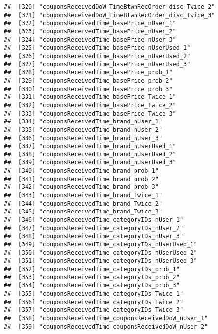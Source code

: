 \documentclass[10pt]{report}
\begin{document}
\begin{verbatim}
##  [320] "couponsReceivedDoW_TimeBtwnRecOrder_disc_Twice_2"     
##  [321] "couponsReceivedDoW_TimeBtwnRecOrder_disc_Twice_3"     
##  [322] "couponsReceivedTime_basePrice_nUser_1"                
##  [323] "couponsReceivedTime_basePrice_nUser_2"                
##  [324] "couponsReceivedTime_basePrice_nUser_3"                
##  [325] "couponsReceivedTime_basePrice_nUserUsed_1"            
##  [326] "couponsReceivedTime_basePrice_nUserUsed_2"            
##  [327] "couponsReceivedTime_basePrice_nUserUsed_3"            
##  [328] "couponsReceivedTime_basePrice_prob_1"                 
##  [329] "couponsReceivedTime_basePrice_prob_2"                 
##  [330] "couponsReceivedTime_basePrice_prob_3"                 
##  [331] "couponsReceivedTime_basePrice_Twice_1"                
##  [332] "couponsReceivedTime_basePrice_Twice_2"                
##  [333] "couponsReceivedTime_basePrice_Twice_3"                
##  [334] "couponsReceivedTime_brand_nUser_1"                    
##  [335] "couponsReceivedTime_brand_nUser_2"                    
##  [336] "couponsReceivedTime_brand_nUser_3"                    
##  [337] "couponsReceivedTime_brand_nUserUsed_1"                
##  [338] "couponsReceivedTime_brand_nUserUsed_2"                
##  [339] "couponsReceivedTime_brand_nUserUsed_3"                
##  [340] "couponsReceivedTime_brand_prob_1"                     
##  [341] "couponsReceivedTime_brand_prob_2"                     
##  [342] "couponsReceivedTime_brand_prob_3"                     
##  [343] "couponsReceivedTime_brand_Twice_1"                    
##  [344] "couponsReceivedTime_brand_Twice_2"                    
##  [345] "couponsReceivedTime_brand_Twice_3"                    
##  [346] "couponsReceivedTime_categoryIDs_nUser_1"              
##  [347] "couponsReceivedTime_categoryIDs_nUser_2"              
##  [348] "couponsReceivedTime_categoryIDs_nUser_3"              
##  [349] "couponsReceivedTime_categoryIDs_nUserUsed_1"          
##  [350] "couponsReceivedTime_categoryIDs_nUserUsed_2"          
##  [351] "couponsReceivedTime_categoryIDs_nUserUsed_3"          
##  [352] "couponsReceivedTime_categoryIDs_prob_1"               
##  [353] "couponsReceivedTime_categoryIDs_prob_2"               
##  [354] "couponsReceivedTime_categoryIDs_prob_3"               
##  [355] "couponsReceivedTime_categoryIDs_Twice_1"              
##  [356] "couponsReceivedTime_categoryIDs_Twice_2"              
##  [357] "couponsReceivedTime_categoryIDs_Twice_3"              
##  [358] "couponsReceivedTime_couponsReceivedDoW_nUser_1"       
##  [359] "couponsReceivedTime_couponsReceivedDoW_nUser_2"       

\end{verbatim}
\end{document}
